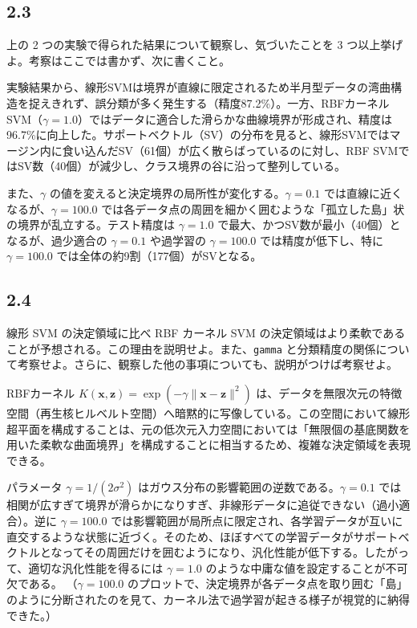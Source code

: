 \documentclass[11pt,a4paper,dvipdfmx]{article}
\numberwithin{equation}{section}
\newenvironment{proofbox}[0]
{
    \begin{mdframed}[
        linecolor=black,
        topline=false,
        bottomline=false,
        rightline=false,
        leftline=true,
        linewidth=2pt,
        innerleftmargin=10pt,
        skipabove=\baselineskip,
        skipbelow=\baselineskip,
    ]
}
{
    \end{mdframed}
}
\newenvironment{note}[0]
{
    \begin{tcolorbox}[sharp corners, colframe=gray!20, colback=gray!20, width=\textwidth]
}
{
    \end{tcolorbox}
}
\begin{document}
\subsection*{2.3}
\begin{note}
上の 2 つの実験で得られた結果について観察し、気づいたことを 3 つ以上挙げよ。考察はここでは書かず、次に書くこと。
\end{note}
\begin{proofbox}
実験結果から、線形SVMは境界が直線に限定されるため半月型データの湾曲構造を捉えきれず、誤分類が多く発生する（精度87.2\%）。一方、RBFカーネルSVM（$\gamma=1.0$）ではデータに適合した滑らかな曲線境界が形成され、精度は96.7\%に向上した。サポートベクトル（SV）の分布を見ると、線形SVMではマージン内に食い込んだSV（61個）が広く散らばっているのに対し、RBF SVMではSV数（40個）が減少し、クラス境界の谷に沿って整列している。

また、$\gamma$ の値を変えると決定境界の局所性が変化する。$\gamma=0.1$ では直線に近くなるが、$\gamma=100.0$ では各データ点の周囲を細かく囲むような「孤立した島」状の境界が乱立する。テスト精度は $\gamma=1.0$ で最大、かつSV数が最小（40個）となるが、過少適合の $\gamma=0.1$ や過学習の $\gamma=100.0$ では精度が低下し、特に $\gamma=100.0$ では全体の約9割（177個）がSVとなる。
\end{proofbox}

\subsection*{2.4}
\begin{note}
線形 SVM の決定領域に比べ RBF カーネル SVM の決定領域はより柔軟であることが予想される。この理由を説明せよ。また、\texttt{gamma} と分類精度の関係について考察せよ。さらに、観察した他の事項についても、説明がつけば考察せよ。
\end{note}
\begin{proofbox}
RBFカーネル $K(\bm{x}, \bm{z}) = \exp(-\gamma \lVert \bm{x} - \bm{z} \rVert^2)$ は、データを無限次元の特徴空間（再生核ヒルベルト空間）へ暗黙的に写像している。この空間において線形超平面を構成することは、元の低次元入力空間においては「無限個の基底関数を用いた柔軟な曲面境界」を構成することに相当するため、複雑な決定領域を表現できる。

パラメータ $\gamma = 1/(2\sigma^2)$ はガウス分布の影響範囲の逆数である。$\gamma=0.1$ では相関が広すぎて境界が滑らかになりすぎ、非線形データに追従できない（過小適合）。逆に $\gamma=100.0$ では影響範囲が局所点に限定され、各学習データが互いに直交するような状態に近づく。そのため、ほぼすべての学習データがサポートベクトルとなってその周囲だけを囲むようになり、汎化性能が低下する。したがって、適切な汎化性能を得るには $\gamma=1.0$ のような中庸な値を設定することが不可欠である。
（$\gamma=100.0$ のプロットで、決定境界が各データ点を取り囲む「島」のように分断されたのを見て、カーネル法で過学習が起きる様子が視覚的に納得できた。）
\end{proofbox}
\end{document}
